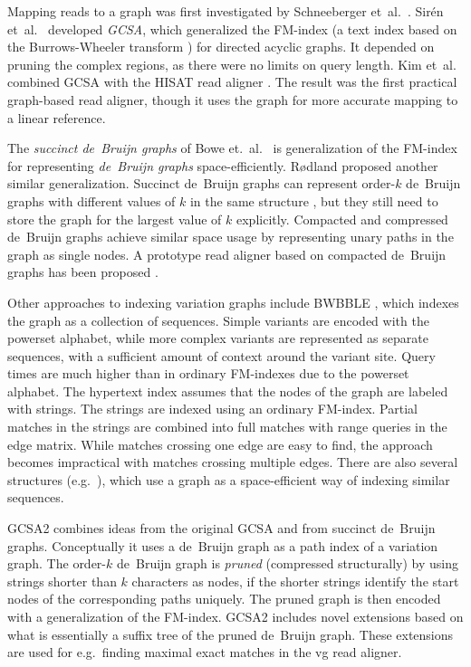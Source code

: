 \documentclass[a4paper,UKenglish]{lipics-v2016}
\newcommand{\orderk}[1]{order\nobreakdash-$#1$}
\begin{document}
Mapping reads to a graph was first investigated by Schneeberger et~al.~\cite{Schneeberger2009}. Sirén et~al.~\cite{Siren2014} developed \emph{GCSA}, which generalized the FM\nobreakdash-index \cite{Ferragina2005a} (a text index based on the Burrows-Wheeler transform \cite{Burrows1994}) for directed acyclic graphs. It depended on pruning the complex regions, as there were no limits on query length. Kim et~al.~\cite{Kim2015-2016} combined GCSA with the HISAT read aligner \cite{Kim2015}. The result was the first practical graph-based read aligner, though it uses the graph for more accurate mapping to a linear reference.

The \emph{succinct de~Bruijn graphs} of Bowe et.~al.~\cite{Bowe2012} is generalization of the FM\nobreakdash-index for representing \emph{de~Bruijn graphs} space-efficiently. Rødland \cite{Roedland2013} proposed another similar generalization. Succinct de~Bruijn graphs can represent \orderk{k} de~Bruijn graphs with different values of $k$ in the same structure \cite{Boucher2014}, but they still need to store the graph for the largest value of $k$ explicitly. Compacted \cite{Cazaux2014} and compressed de~Bruijn graphs \cite{Marcus2014} achieve similar space usage by representing unary paths in the graph as single nodes. A prototype read aligner based on compacted de~Bruijn graphs has been proposed \cite{Limasset2015}.

Other approaches to indexing variation graphs include BWBBLE \cite{Huang2013}, which indexes the graph as a collection of sequences. Simple variants are encoded with the powerset alphabet, while more complex variants are represented as separate sequences, with a sufficient amount of context around the variant site. Query times are much higher than in ordinary FM\nobreakdash-indexes due to the powerset alphabet. The hypertext index \cite{Thachuk2013} assumes that the nodes of the graph are labeled with strings. The strings are indexed using an ordinary FM-index. Partial matches in the strings are combined into full matches with range queries in the edge matrix. While matches crossing one edge are easy to find, the approach becomes impractical with matches crossing multiple edges. There are also several structures (e.g.~\cite{Huang2010,Wandelt2013,Danek2014,Na2015}), which use a graph as a space-efficient way of indexing similar sequences.

GCSA2 combines ideas from the original GCSA and from succinct de~Bruijn graphs. Conceptually it uses a de~Bruijn graph as a path index of a variation graph. The \orderk{k} de~Bruijn graph is \emph{pruned} (compressed structurally) by using strings shorter than $k$ characters as nodes, if the shorter strings identify the start nodes of the corresponding paths uniquely. The pruned graph is then encoded with a generalization of the FM\nobreakdash-index. GCSA2 includes novel extensions based on what is essentially a suffix tree of the pruned de~Bruijn graph. These extensions are used for e.g.~finding maximal exact matches in the vg read aligner.
\end{document}

